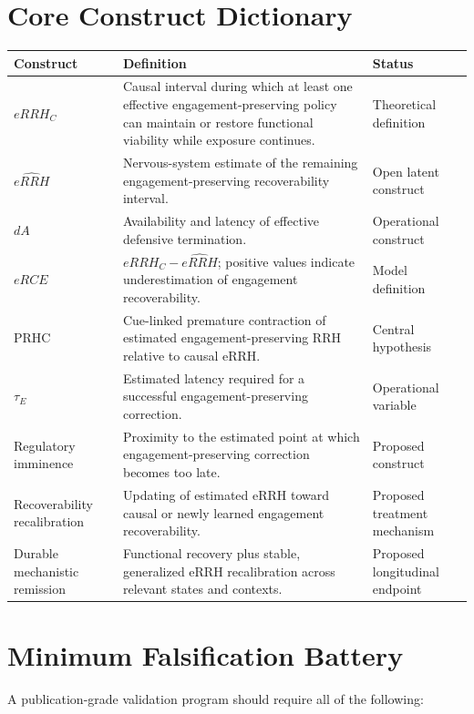 \documentclass[11pt]{article}
\begin{document}
\section{Core Construct Dictionary}

\begin{longtable}{p{}p{}p{}}
\toprule
\textbf{Construct} & \textbf{Definition} & \textbf{Status} \\
\midrule
$eRRH_C$ & Causal interval during which at least one effective engagement-preserving policy can maintain or restore functional viability while exposure continues. & Theoretical definition \\
$\widehat{eRRH}$ & Nervous-system estimate of the remaining engagement-preserving recoverability interval. & Open latent construct \\
$dA$ & Availability and latency of effective defensive termination. & Operational construct \\
$eRCE$ & $eRRH_C-\widehat{eRRH}$; positive values indicate underestimation of engagement recoverability. & Model definition \\
PRHC & Cue-linked premature contraction of estimated engagement-preserving RRH relative to causal eRRH. & Central hypothesis \\
$\tau_E$ & Estimated latency required for a successful engagement-preserving correction. & Operational variable \\
Regulatory imminence & Proximity to the estimated point at which engagement-preserving correction becomes too late. & Proposed construct \\
Recoverability recalibration & Updating of estimated eRRH toward causal or newly learned engagement recoverability. & Proposed treatment mechanism \\
Durable mechanistic remission & Functional recovery plus stable, generalized eRRH recalibration across relevant states and contexts. & Proposed longitudinal endpoint \\
\bottomrule
\end{longtable}

\section{Minimum Falsification Battery}

A publication-grade validation program should require all of the following:
\end{document}
